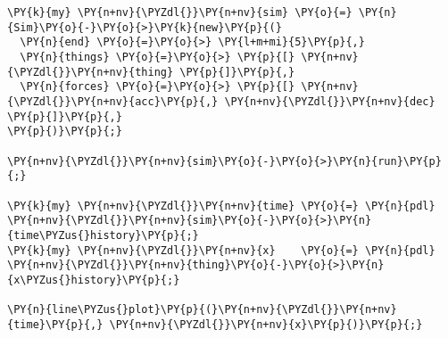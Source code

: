 \begin{Verbatim}[commandchars=\\\{\}]
\PY{k}{my} \PY{n+nv}{\PYZdl{}}\PY{n+nv}{sim} \PY{o}{=} \PY{n}{Sim}\PY{o}{-}\PY{o}{>}\PY{k}{new}\PY{p}{(}
  \PY{n}{end} \PY{o}{=}\PY{o}{>} \PY{l+m+mi}{5}\PY{p}{,}
  \PY{n}{things} \PY{o}{=}\PY{o}{>} \PY{p}{[} \PY{n+nv}{\PYZdl{}}\PY{n+nv}{thing} \PY{p}{]}\PY{p}{,}
  \PY{n}{forces} \PY{o}{=}\PY{o}{>} \PY{p}{[} \PY{n+nv}{\PYZdl{}}\PY{n+nv}{acc}\PY{p}{,} \PY{n+nv}{\PYZdl{}}\PY{n+nv}{dec} \PY{p}{]}\PY{p}{,}
\PY{p}{)}\PY{p}{;}

\PY{n+nv}{\PYZdl{}}\PY{n+nv}{sim}\PY{o}{-}\PY{o}{>}\PY{n}{run}\PY{p}{;}

\PY{k}{my} \PY{n+nv}{\PYZdl{}}\PY{n+nv}{time} \PY{o}{=} \PY{n}{pdl} \PY{n+nv}{\PYZdl{}}\PY{n+nv}{sim}\PY{o}{-}\PY{o}{>}\PY{n}{time\PYZus{}history}\PY{p}{;}
\PY{k}{my} \PY{n+nv}{\PYZdl{}}\PY{n+nv}{x}    \PY{o}{=} \PY{n}{pdl} \PY{n+nv}{\PYZdl{}}\PY{n+nv}{thing}\PY{o}{-}\PY{o}{>}\PY{n}{x\PYZus{}history}\PY{p}{;}

\PY{n}{line\PYZus{}plot}\PY{p}{(}\PY{n+nv}{\PYZdl{}}\PY{n+nv}{time}\PY{p}{,} \PY{n+nv}{\PYZdl{}}\PY{n+nv}{x}\PY{p}{)}\PY{p}{;}
\end{Verbatim}
